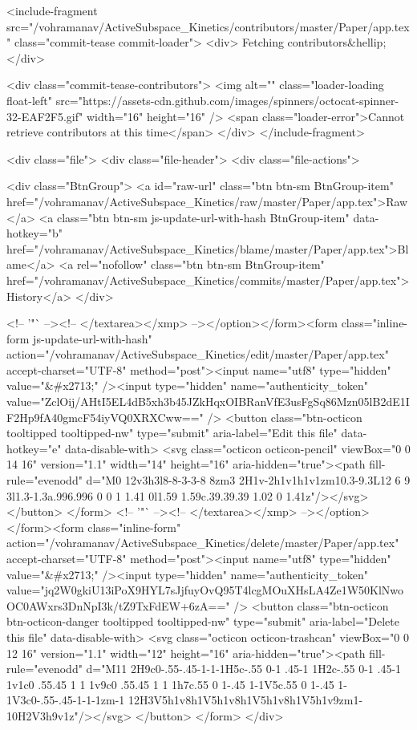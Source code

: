  <include-fragment src="/vohramanav/ActiveSubspace_Kinetics/contributors/master/Paper/app.tex" class="commit-tease commit-loader">
    <div>
      Fetching contributors&hellip;
    </div>

    <div class="commit-tease-contributors">
        <img alt="" class="loader-loading float-left" src="https://assets-cdn.github.com/images/spinners/octocat-spinner-32-EAF2F5.gif" width="16" height="16" />
      <span class="loader-error">Cannot retrieve contributors at this time</span>
    </div>
</include-fragment>


  <div class="file">
    <div class="file-header">
  <div class="file-actions">

    <div class="BtnGroup">
      <a id="raw-url" class="btn btn-sm BtnGroup-item" href="/vohramanav/ActiveSubspace_Kinetics/raw/master/Paper/app.tex">Raw</a>
        <a class="btn btn-sm js-update-url-with-hash BtnGroup-item" data-hotkey="b" href="/vohramanav/ActiveSubspace_Kinetics/blame/master/Paper/app.tex">Blame</a>
      <a rel="nofollow" class="btn btn-sm BtnGroup-item" href="/vohramanav/ActiveSubspace_Kinetics/commits/master/Paper/app.tex">History</a>
    </div>


          <!-- '"` --><!-- </textarea></xmp> --></option></form><form class="inline-form js-update-url-with-hash" action="/vohramanav/ActiveSubspace_Kinetics/edit/master/Paper/app.tex" accept-charset="UTF-8" method="post"><input name="utf8" type="hidden" value="&#x2713;" /><input type="hidden" name="authenticity_token" value="ZclOij/AHtI5EL4dB5xh3b45JZkHqxOIBRanVfE3usFgSq86Mzn05lB2dE1IF2Hp9fA40gmcF54iyVQ0XRXCww==" />
            <button class="btn-octicon tooltipped tooltipped-nw" type="submit"
              aria-label="Edit this file" data-hotkey="e" data-disable-with>
              <svg class="octicon octicon-pencil" viewBox="0 0 14 16" version="1.1" width="14" height="16" aria-hidden="true"><path fill-rule="evenodd" d="M0 12v3h3l8-8-3-3-8 8zm3 2H1v-2h1v1h1v1zm10.3-9.3L12 6 9 3l1.3-1.3a.996.996 0 0 1 1.41 0l1.59 1.59c.39.39.39 1.02 0 1.41z"/></svg>
            </button>
</form>
        <!-- '"` --><!-- </textarea></xmp> --></option></form><form class="inline-form" action="/vohramanav/ActiveSubspace_Kinetics/delete/master/Paper/app.tex" accept-charset="UTF-8" method="post"><input name="utf8" type="hidden" value="&#x2713;" /><input type="hidden" name="authenticity_token" value="jq2W0gkiU13iPoX9HYL7sJjfuyOvQ95T4lcgMOuXHsLA4Ze1W50KlNwoOC0AWxrs3DnNpI3k/tZ9TxFdEW+6zA==" />
          <button class="btn-octicon btn-octicon-danger tooltipped tooltipped-nw" type="submit"
            aria-label="Delete this file" data-disable-with>
            <svg class="octicon octicon-trashcan" viewBox="0 0 12 16" version="1.1" width="12" height="16" aria-hidden="true"><path fill-rule="evenodd" d="M11 2H9c0-.55-.45-1-1-1H5c-.55 0-1 .45-1 1H2c-.55 0-1 .45-1 1v1c0 .55.45 1 1 1v9c0 .55.45 1 1 1h7c.55 0 1-.45 1-1V5c.55 0 1-.45 1-1V3c0-.55-.45-1-1-1zm-1 12H3V5h1v8h1V5h1v8h1V5h1v8h1V5h1v9zm1-10H2V3h9v1z"/></svg>
          </button>
</form>  </div>

